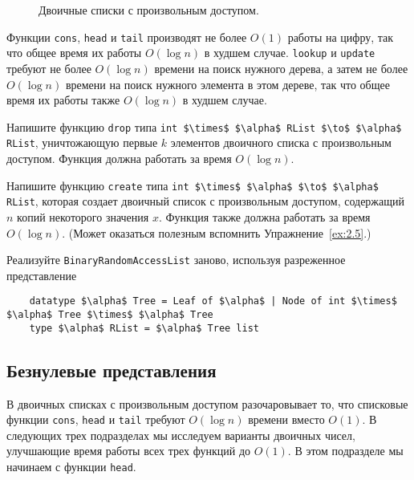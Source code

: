 \begin{figure}
  \centering

  \caption{Двоичные списки с произвольным доступом.}
  \label{fig:9.6}
\end{figure}

Функции \lstinline!cons!, \lstinline!head! и \lstinline!tail!
производят не более $O(1)$ работы на цифру, так что общее время их
работы $O(\log n)$ в худшем случае. \lstinline!lookup! и
\lstinline!update! требуют не более $O(\log n)$ времени на поиск
нужного дерева, а затем не более $O(\log n)$ времени на поиск нужного
элемента в этом дереве, так что общее время их работы также $O(\log
n)$ в худшем случае.

\begin{exercise}\label{ex:9.1}
  Напишите функцию \lstinline!drop! типа
  \lstinline!int $\times$ $\alpha$ RList $\to$ $\alpha$ RList!, уничтожающую первые $k$
  элементов двоичного списка с произвольным доступом. Функция должна
  работать за время $O(\log n)$.
\end{exercise}

\begin{exercise}\label{ex:9.2}
  Напишите функцию \lstinline!create! типа
  \lstinline!int $\times$ $\alpha$ $\to$ $\alpha$ RList!, которая создает
  двоичный список с произвольным доступом, содержащий $n$ копий
  некоторого значения $x$. Функция также должна работать за время
  $O(\log n)$. (Может оказаться полезным вспомнить Упражнение~\ref{ex:2.5}.)
\end{exercise}

\begin{exercise}\label{ex:9.3}
  Реализуйте \lstinline!BinaryRandomAccessList! заново, используя
  разреженное представление
  \begin{lstlisting}
    datatype $\alpha$ Tree = Leaf of $\alpha$ | Node of int $\times$ $\alpha$ Tree $\times$ $\alpha$ Tree
    type $\alpha$ RList = $\alpha$ Tree list
  \end{lstlisting}
\end{exercise}

\subsection{Безнулевые представления}
\label{sc:9.2.2}

В двоичных списках с произвольным доступом разочаровывает то, что
списковые функции \lstinline!cons!, \lstinline!head! и
\lstinline!tail! требуют $O(\log n)$ времени вместо $O(1)$. В
следующих трех подразделах мы исследуем варианты двоичных чисел,
улучшающие время работы всех трех функций до $O(1)$. В этом подразделе
мы начинаем с функции \lstinline!head!.

